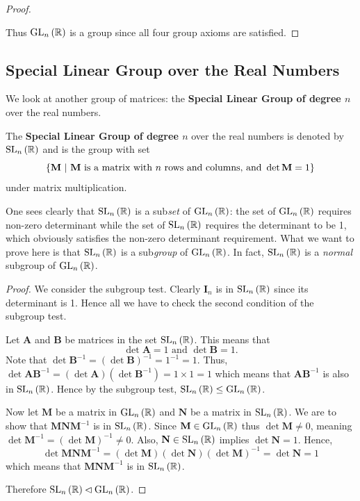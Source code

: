 \begin{proof}
\begin{enumerate}
    \end{enumerate}
    Thus $\mathrm{GL}_{n}\left(\mathbb{R}\right)$ is a group since all four group axioms are satisfied.
\end{proof}

\subsection{Special Linear Group over the Real Numbers}
We look at another group of matrices: the \textbf{Special Linear Group of degree $n$} over the real numbers.
\begin{definition}
    The \textbf{Special Linear Group of degree $n$} over the real numbers is denoted by $\mathrm{SL}_{n}\left(\mathbb{R}\right)$ and is the group with set
    \[
        \left\{\textbf{M} \ | \ \text{\textbf{M} is a matrix with } n \text{ rows and columns, and } \det \textbf{M} = 1\right\}
    \]
    under matrix multiplication.
\end{definition}
One sees clearly that $\mathrm{SL}_{n}\left(\mathbb{R}\right)$ is a sub\textit{set} of $\mathrm{GL}_{n}\left(\mathbb{R}\right)$: the set of $\mathrm{GL}_{n}\left(\mathbb{R}\right)$ requires non-zero determinant while the set of $\mathrm{SL}_{n}\left(\mathbb{R}\right)$ requires the determinant to be 1, which obviously satisfies the non-zero determinant requirement. What we want to prove here is that $\mathrm{SL}_{n}\left(\mathbb{R}\right)$ is a sub\textit{group} of $\mathrm{GL}_{n}\left(\mathbb{R}\right)$. In fact, $\mathrm{SL}_{n}\left(\mathbb{R}\right)$ is a \textit{normal} subgroup of $\mathrm{GL}_{n}\left(\mathbb{R}\right)$.

\begin{proof}
    We consider the subgroup test. Clearly $\textbf{I}_n$ is in $\mathrm{SL}_{n}\left(\mathbb{R}\right)$ since its determinant is 1. Hence all we have to check the second condition of the subgroup test.

    Let \textbf{A} and \textbf{B} be matrices in the set $\mathrm{SL}_{n}\left(\mathbb{R}\right)$. This means that
    \[
        \det \textbf{A} = 1 \text{ and } \det \textbf{B} = 1.
    \]
    Note that $\det \textbf{B}^{-1} = (\det \textbf{B})^{-1} = 1^{-1} = 1$. Thus, $\det \textbf{AB}^{-1} = (\det \textbf{A})(\det \textbf{B}^{-1}) = 1 \times 1  = 1$ which means that $\textbf{AB}^{-1}$ is also in $\mathrm{SL}_{n}\left(\mathbb{R}\right)$. Hence by the subgroup test, $\mathrm{SL}_{n}\left(\mathbb{R}\right) \leq \mathrm{GL}_{n}\left(\mathbb{R}\right)$.
    
    Now let $\textbf{M}$ be a matrix in $\mathrm{GL}_{n}\left(\mathbb{R}\right)$ and $\textbf{N}$ be a matrix in $\mathrm{SL}_{n}\left(\mathbb{R}\right)$. We are to show that $\textbf{MNM}^{-1}$ is in $\mathrm{SL}_{n}\left(\mathbb{R}\right)$. Since $\textbf{M} \in \mathrm{GL}_{n}\left(\mathbb{R}\right)$ thus $\det \textbf{M} \neq 0$, meaning $\det \textbf{M}^{-1} = (\det \textbf{M})^{-1} \neq 0$. Also, $\textbf{N} \in \mathrm{SL}_{n}\left(\mathbb{R}\right)$ implies $\det \textbf{N} = 1$. Hence,
    \[
        \det \textbf{MNM}^{-1} = (\det \textbf{M})(\det \textbf{N})(\det \textbf{M})^{-1} = \det \textbf{N} = 1
    \]
    which means that $\textbf{MNM}^{-1}$ is in $\mathrm{SL}_{n}\left(\mathbb{R}\right)$.

    Therefore $\mathrm{SL}_{n}\left(\mathbb{R}\right) \lhd \mathrm{GL}_{n}\left(\mathbb{R}\right)$.
\end{proof}

